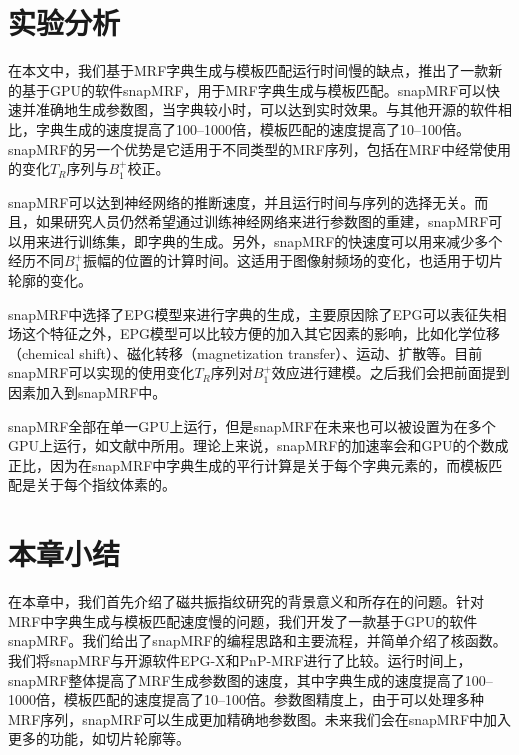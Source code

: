 \section{实验分析}
在本文中，我们基于MRF字典生成与模板匹配运行时间慢的缺点，推出了一款新的基于GPU的软件snapMRF，用于MRF字典生成与模板匹配。snapMRF可以快速并准确地生成参数图，当字典较小时，可以达到实时效果。与其他开源的软件相比，字典生成的速度提高了100--1000倍，模板匹配的速度提高了10--100倍。snapMRF的另一个优势是它适用于不同类型的MRF序列，包括在MRF中经常使用的变化$T_R$序列与$B_1^+$校正。

snapMRF可以达到神经网络的推断速度，并且运行时间与序列的选择无关。而且，如果研究人员仍然希望通过训练神经网络来进行参数图的重建，snapMRF可以用来进行训练集，即字典的生成。另外，snapMRF的快速度可以用来减少多个经历不同$B_1^+$振幅的位置的计算时间。这适用于图像射频场的变化，也适用于切片轮廓\cite{Ma_B1_MRF}的变化。

snapMRF中选择了EPG模型来进行字典的生成，主要原因除了EPG可以表征失相场这个特征之外，EPG模型可以比较方便的加入其它因素的影响，比如化学位移（chemical shift）、磁化转移（magnetization transfer）\cite{Hamilton}、运动、扩散等。目前snapMRF可以实现的使用变化$T_R$序列对$B_1^+$效应进行建模。之后我们会把前面提到因素加入到snapMRF中。

snapMRF全部在单一GPU上运行，但是snapMRF在未来也可以被设置为在多个GPU上运行，如文献\cite{tron}中所用。理论上来说，snapMRF的加速率会和GPU的个数成正比，因为在snapMRF中字典生成的平行计算是关于每个字典元素的，而模板匹配是关于每个指纹体素的。

\section{本章小结}
在本章中，我们首先介绍了磁共振指纹研究的背景意义和所存在的问题。针对MRF中字典生成与模板匹配速度慢的问题，我们开发了一款基于GPU的软件snapMRF。我们给出了snapMRF的编程思路和主要流程，并简单介绍了核函数。我们将snapMRF与开源软件EPG-X和PnP-MRF进行了比较。运行时间上，snapMRF整体提高了MRF生成参数图的速度，其中字典生成的速度提高了100--1000倍，模板匹配的速度提高了10--100倍。参数图精度上，由于可以处理多种MRF序列，snapMRF可以生成更加精确地参数图。未来我们会在snapMRF中加入更多的功能，如切片轮廓等。





















